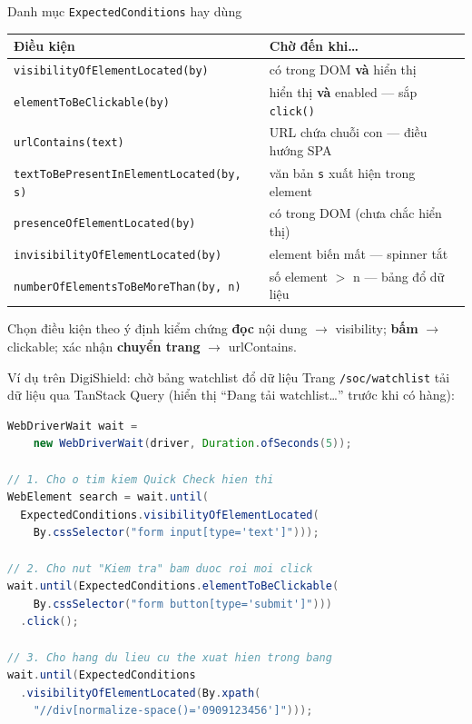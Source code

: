 \documentclass[aspectratio=169,12pt]{beamer}
\begin{document}
\begin{frame}{Danh mục \texttt{ExpectedConditions} hay dùng}
  \begin{center}
  \footnotesize
  \begin{tabular}{p{7.5cm}p{5.6cm}}
    \toprule
    \textbf{Điều kiện} & \textbf{Chờ đến khi\ldots} \\
    \midrule
    \texttt{visibilityOfElementLocated(by)}
      & có trong DOM \textbf{và} hiển thị \\
    \texttt{elementToBeClickable(by)}
      & hiển thị \textbf{và} enabled --- sắp \texttt{click()} \\
    \texttt{urlContains(text)}
      & URL chứa chuỗi con --- điều hướng SPA \\
    \texttt{textToBePresentInElementLocated(by, s)}
      & văn bản \texttt{s} xuất hiện trong element \\
    \texttt{presenceOfElementLocated(by)}
      & có trong DOM (chưa chắc hiển thị) \\
    \texttt{invisibilityOfElementLocated(by)}
      & element biến mất --- spinner tắt \\
    \texttt{numberOfElementsToBeMoreThan(by, n)}
      & số element $>$ n --- bảng đổ dữ liệu \\
    \bottomrule
  \end{tabular}
  \end{center}

  \begin{block}{Chọn điều kiện theo ý định kiểm chứng}
    \textbf{đọc} nội dung $\to$ visibility; \textbf{bấm} $\to$
    clickable; xác nhận \textbf{chuyển trang} $\to$ urlContains.
  \end{block}
\end{frame}

\begin{frame}[fragile]{Ví dụ trên DigiShield: chờ bảng watchlist đổ dữ liệu}
  Trang \texttt{/soc/watchlist} tải dữ liệu qua TanStack Query
  (hiển thị ``Đang tải watchlist\ldots'' trước khi có hàng):

\begin{lstlisting}[language=Java,basicstyle=\ttfamily\scriptsize]
WebDriverWait wait =
    new WebDriverWait(driver, Duration.ofSeconds(5));

// 1. Cho o tim kiem Quick Check hien thi
WebElement search = wait.until(
  ExpectedConditions.visibilityOfElementLocated(
    By.cssSelector("form input[type='text']")));

// 2. Cho nut "Kiem tra" bam duoc roi moi click
wait.until(ExpectedConditions.elementToBeClickable(
    By.cssSelector("form button[type='submit']")))
  .click();

// 3. Cho hang du lieu cu the xuat hien trong bang
wait.until(ExpectedConditions
  .visibilityOfElementLocated(By.xpath(
    "//div[normalize-space()='0909123456']")));
\end{lstlisting}
\end{frame}
\end{document}
